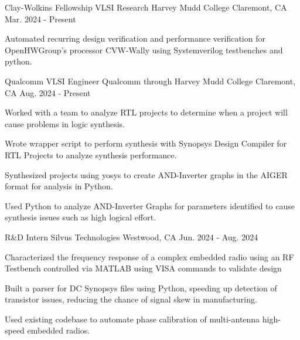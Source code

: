 

\begin{cventries}

  \cventry
    {Clay-Wolkins Fellowship VLSI Research} %
    {Harvey Mudd College} %
    {Claremont, CA} %
    {Mar. 2024 - Present} %
    {
    \begin{cvitems}
      \item {
      Automated recurring design verification and performance verification for OpenHWGroup's processor CVW-Wally using Systemverilog testbenches and python.
      }
    \end{cvitems}
    }

  \cventry
    {Qualcomm VLSI Engineer} %
    {Qualcomm through Harvey Mudd College} %
    {Claremont, CA} %
    {Aug. 2024 - Present} %
    {
    \begin{cvitems}
      \item{
      Worked with a team to analyze RTL projects to determine when a project will cause problems in logic synthesis.
      }
      \item{
      Wrote wrapper script to perform synthesis with Synopsys Design Compiler for RTL Projects to analyze synthesis performance.
      }
      \item{
      Synthesized projects using yosys to create AND-Inverter graphs in the AIGER format for analysis in Python.
      }
      \item{
      Used Python to analyze AND-Inverter Graphs for parameters identified to cause synthesis issues such as high logical effort.
      }
    \end{cvitems}
    }

  \cventry
    {R\&D Intern} %
    {Silvus Technologies} %
    {Westwood, CA} %
    {Jun. 2024 - Aug. 2024} %
    {
      \begin{cvitems} %
        \item {
        Characterized the frequency response of a complex embedded radio using an RF Testbench controlled via MATLAB using VISA commands to validate design
        }
        \item {
        Built a parser for DC Synopsys files using Python, speeding up detection of transistor issues, reducing the chance of signal skew in manufacturing.
        }
        \item {
        Used existing codebase to automate phase calibration of multi-antenna high-speed embedded radios.
        }
      \end{cvitems}
    }


\end{cventries}
